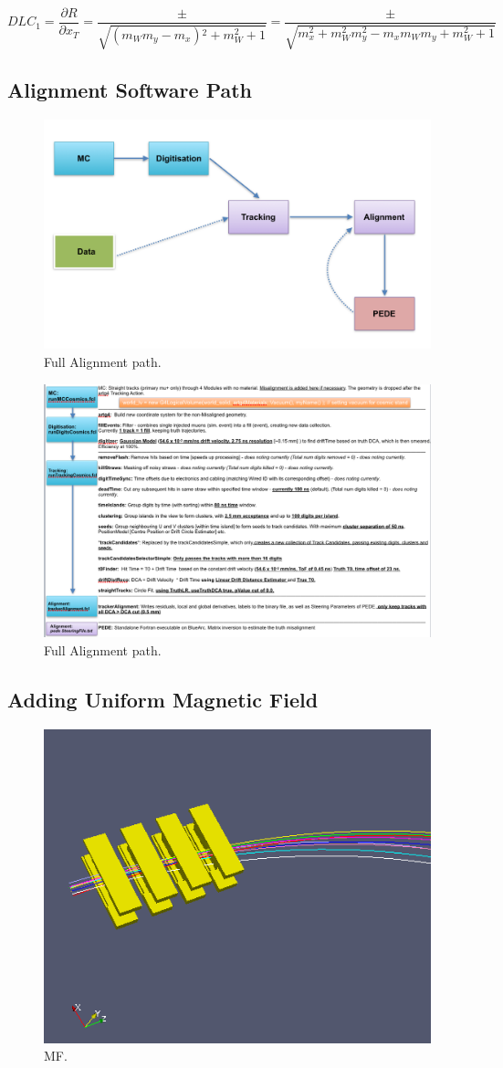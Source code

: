 \documentclass[a4paper,11pt]{article}
\begin{document}
\begin{equation}
DLC_1 = \frac{\partial R}{\partial x_T} =   \frac{\pm}{\sqrt{\left(m_W m_y-m_x\right){}^2+m_W^2+1}} = \frac{\pm}{\sqrt{m_x^2 + m_W^2 m_y^2 - m_x m_W m_y + m_W^2 + 1}} 
\end{equation}

\subsection{Alignment Software Path}

\begin{figure}[!ht]
\centering
\includegraphics[width=0.4\linewidth]{fig/AlignPath.png}
\caption{Full Alignment path.}
\label{fig:AlignPath}
\end{figure}

\begin{figure}[!ht]
\centering
\includegraphics[width=0.4\linewidth]{fig/AlignPath2.png}
\caption{Full Alignment path.}
\label{fig:AlignPath}
\end{figure}


\subsection{Adding Uniform Magnetic Field}

\begin{figure}[!ht]
\centering
\includegraphics[width=0.4\linewidth]{fig/G4.png}
\caption{MF.}
\label{fig:AlignPath}
\end{figure}
\end{document}
